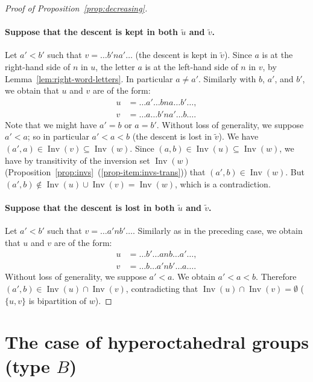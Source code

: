 \documentclass[ALCO,Unicode]{cedram}
\theoremstyle{definition}
\DeclareMathOperator{\invs}{Inv}
\newcommand{\dec}[1]{\widetilde{#1}}
\begin{document}
\begin{proof}[Proof of Proposition~\ref{prop:decreasing}]
\paragraph{Suppose that the descent is kept in both $\dec{u}$ and $\dec{v}$.} Let  $a' < b'$ such that $v=\dots b'na'\dots$ (the descent is kept in $\dec{v}$). Since  $a$ is at the right-hand side  of $n$ in $u$, the letter $a$ is at the left-hand side of $n$ in $v$, by Lemma~\ref{lem:right-word-letters}. In particular $a \neq a'$. Similarly with  $b$, $a'$, and $b'$, we obtain that $u$ and $v$ are of the form:
\begin{align*}
u &= \dots a' \dots bna \dots b'  \dots, \\
v &= \dots a \dots b' n a' \dots b \dots.
\end{align*}
Note that we might have $a' = b$ or $a = b'$. Without loss of generality, we suppose $a' < a$; so in particular $a' < a < b$ (the descent is lost in $\dec{v}$). We have $(a', a) \in \invs(v) \subseteq \invs(w)$. Since  $(a,b) \in \invs(u) \subseteq \invs(w)$, we have by transitivity of the inversion set $\invs(w)$ (Proposition~\ref{prop:invs}~(\ref{prop-item:invs-trans})) that $(a', b) \in \invs(w)$. But $(a', b)\notin\invs(u)\cup\invs(v)=\invs(w)$, which is a contradiction.

\paragraph{Suppose that the descent is lost in both $\dec{u}$ and $\dec{v}$.} Let  $a' < b'$ such that $v=\dots a'nb'\dots$. Similarly as in the preceding case,  we obtain that $u$ and $v$ are of the form:
\begin{align*}
u &= \dots b' \dots anb \dots a'  \dots, \\
v &= \dots b \dots a' n b' \dots a \dots.
\end{align*}
Without loss of generality, we suppose $a' < a$. We obtain $a' < a < b$. Therefore $(a', b) \in \invs(u) \cap \invs(v)$, contradicting that $\invs(u) \cap \invs(v) = \emptyset$ ($\{u,v\}$ is bipartition of $w$).
\end{proof}


\section{The case of hyperoctahedral groups (type \texorpdfstring{$B$}{B})}\label{se:Bn}
\end{document}
